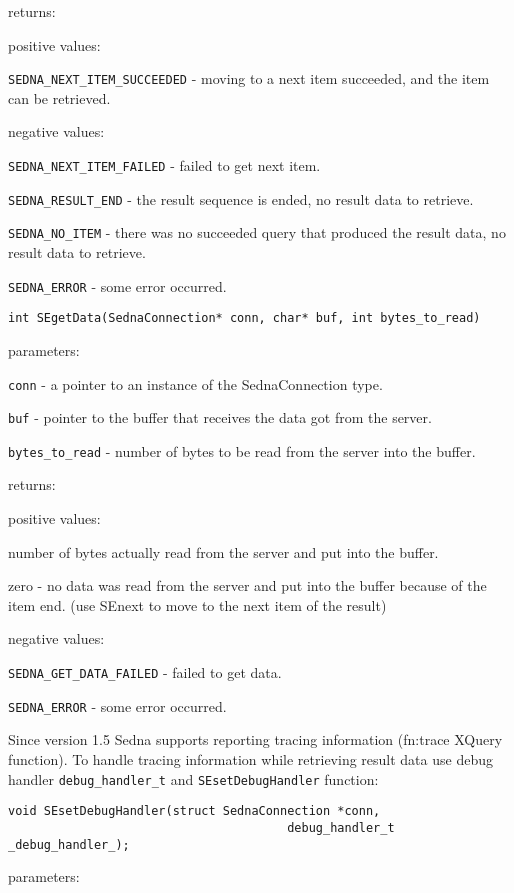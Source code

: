 \documentclass[a4paper,12pt]{article}
\begin{document}
returns:

positive values:

\verb!SEDNA_NEXT_ITEM_SUCCEEDED! - moving to a next item succeeded, and the item can be retrieved.

negative values:

\verb!SEDNA_NEXT_ITEM_FAILED! - failed to get next item.

\verb!SEDNA_RESULT_END! - the result sequence is ended, no result data to retrieve.

\verb!SEDNA_NO_ITEM! - there was no succeeded query that produced the result data, no result data to retrieve.

\verb!SEDNA_ERROR! - some error occurred.

\begin{verbatim}int SEgetData(SednaConnection* conn, char* buf, int bytes_to_read)\end{verbatim}

parameters:

\verb!conn! - a pointer to an instance of the SednaConnection type.

\verb!buf! - pointer to the buffer that receives the data got from the server.

\verb!bytes_to_read! - number of bytes to be read from the server into the buffer.


returns:

positive values:

number of bytes actually read from the server and put into the buffer.

zero - no data was read from the server and put into the buffer because of the item end. (use SEnext to move to the next item of the result)

negative values:

\verb!SEDNA_GET_DATA_FAILED! - failed to get data.

\verb!SEDNA_ERROR! - some error occurred.

Since version 1.5 Sedna supports reporting tracing information (fn:trace XQuery function). To handle tracing information while retrieving result data use debug handler \verb!debug_handler_t! and \verb!SEsetDebugHandler! function:

\begin{verbatim}void SEsetDebugHandler(struct SednaConnection *conn,
                                       debug_handler_t _debug_handler_);\end{verbatim}

parameters:
\end{document}
